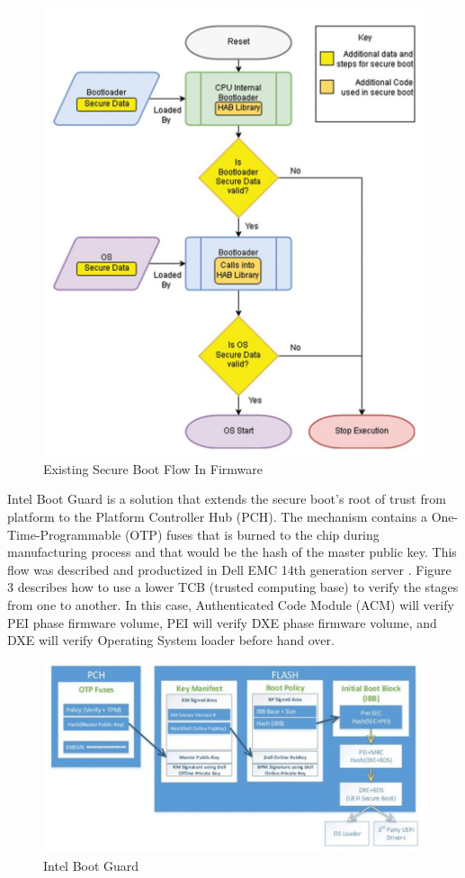 \documentclass[review]{elsarticle}
\begin{document}
\begin{figure}[H]
	\centering
	\includegraphics[width=1\textwidth]{figs/ExistingSecureBootFlowInFirmware.JPG}
	\caption{Existing Secure Boot Flow In Firmware \cite{R5:15}}
\end{figure}

Intel Boot Guard is a solution that extends the secure boot’s root of trust from platform to the Platform Controller Hub (PCH). The mechanism contains a One-Time-Programmable (OTP) fuses that is burned to the chip during manufacturing process and that would be the hash of the master public key. This flow was described and productized in Dell EMC 14th generation server \cite{R5:14} . Figure 3 describes how to use a lower TCB (trusted computing base) to verify the stages from one to another. In this case, Authenticated Code Module (ACM) will verify PEI phase firmware volume, PEI will verify DXE phase firmware volume, and DXE will verify Operating System loader before hand over.

\begin{figure}[H]
	\centering
	\includegraphics[width=1\textwidth]{figs/IntelBootGuard.JPG}
	\caption{Intel Boot Guard \cite{R5:14}}
\end{figure}
\end{document}
